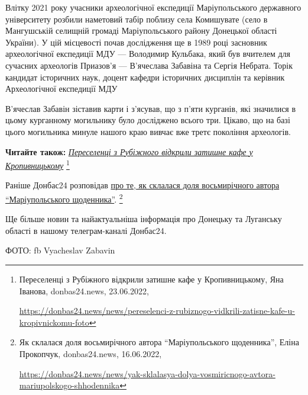 Влітку 2021 року учасники археологічної експедиції Маріупольського державного
університету розбили наметовий табір поблизу села Комишувате (село в
Мангушській селищній громаді Маріупольського району Донецької області України).
У цій місцевості почав дослідження ще в 1989 році засновник археологічної
експедиції МДУ — Володимир Кульбака, який був вчителем для сучасних археологів
Приазов'я — В'ячеслава Забавіна та Сергія Небрата. Торік кандидат історичних
наук, доцент кафедри історичних дисциплін та керівник Археологічної експедиції
МДУ\par\noindent В'ячеслав Забавін зіставив карти і з'ясував, що з п'яти курганів, які
значилися в цьому курганному могильнику було досліджено всього три. Цікаво, що
на базі цього могильника минуле нашого краю вивчає вже третє покоління
археологів.

\textbf{Читайте також:} \href{https://donbas24.news/news/pereselenci-z-rubiznogo-vidkrili-zatisne-kafe-u-kropivnickomu-foto}{\emph{Переселенці з Рубіжного відкрили затишне кафе у Кропивницькому}}%
\footnote{Переселенці з Рубіжного відкрили затишне кафе у Кропивницькому, Яна Іванова, donbas24.news, 23.06.2022, \par%
\url{https://donbas24.news/news/pereselenci-z-rubiznogo-vidkrili-zatisne-kafe-u-kropivnickomu-foto}%
}

Раніше Донбас24 розповідав \href{https://donbas24.news/news/yak-sklalasya-dolya-vosmiricnogo-avtora-mariupolskogo-shhodennika}{про те, як склалася доля восьмирічного автора \enquote{Маріупольського щоденника}}.%
\footnote{Як склалася доля восьмирічного автора \enquote{Маріупольського щоденника}, Еліна Прокопчук, donbas24.news, 16.06.2022, \par\url{https://donbas24.news/news/yak-sklalasya-dolya-vosmiricnogo-avtora-mariupolskogo-shhodennika}}

Ще більше новин та найактуальніша інформація про Донецьку та Луганську області
в нашому телеграм-каналі Донбас24.

ФОТО: fb Vyacheslav Zabavin


